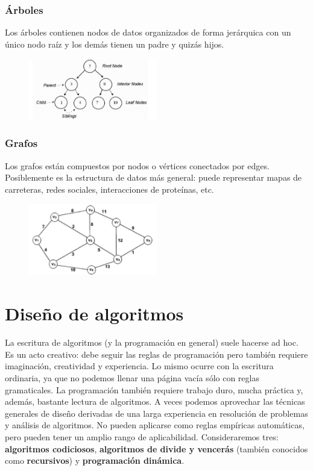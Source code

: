 \subsubsection{Árboles}
Los árboles contienen nodos de datos organizados de forma jerárquica con un único nodo raíz y los demás tienen un padre y quizás hijos.

\begin{figure}[htbp]
\centering
\includegraphics[width = 0.5\textwidth]{figs/tree-datastructure.png}
\end{figure}

\subsubsection{Grafos}
Los grafos están compuestos por nodos o vértices conectados por edges. Posiblemente es la estructura de datos más general: puede representar mapas de carreteras, redes sociales, interacciones de proteínas, etc.

\begin{figure}[htbp]
\centering
\includegraphics[width = 0.5\textwidth]{figs/graph-datastructure.png}
\end{figure}

\section{Diseño de algoritmos}
La escritura de algoritmos (y la programación en general) suele hacerse ad hoc. Es un acto creativo: debe seguir las reglas de programación pero también requiere imaginación, creatividad y experiencia. Lo mismo ocurre con la escritura ordinaria, ya que no podemos llenar una página vacía sólo con reglas gramaticales. La programación también requiere trabajo duro, mucha práctica y, además, bastante lectura de algoritmos. A veces podemos aprovechar las técnicas generales de diseño derivadas de una larga experiencia en resolución de problemas y análisis de algoritmos. No pueden aplicarse como reglas empíricas automáticas, pero pueden tener un amplio rango de aplicabilidad. Consideraremos tres: \textbf{algoritmos codiciosos}, \textbf{algoritmos de divide y vencerás} (también conocidos como \textbf{recursivos}) y \textbf{programación dinámica}.

